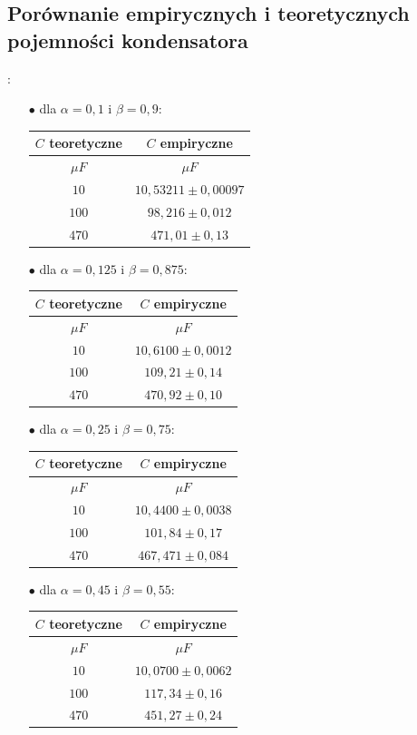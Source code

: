 \documentclass[12pt]{mwart}
\begin{document}
	\subsection{Porównanie empirycznych i teoretycznych pojemności kondensatora}:
	\begin{itemize}
		\item[$\bullet$] dla $\alpha=0,1$ i $\beta=0,9$:
		\begin{table}[h]
			\centering
			\begin{tabular}{c|c}
				\hline
				$C$ teoretyczne & $C$ empiryczne \\ \hline
				$\mu F$ & $\mu F$ \\ \hline
				$10$ & $10,53211\pm0,00097$  \\ \hline
				$100$ & $98,216\pm0,012$  \\ \hline
				$470$ & $471,01\pm0,13$  \\ \hline
			\end{tabular}
		\end{table}
		\item[$\bullet$] dla $\alpha=0,125$ i $\beta=0,875$:
		\begin{table}[h]
			\centering
			\begin{tabular}{c|c}
				\hline
				$C$ teoretyczne & $C$ empiryczne \\ \hline
				$\mu F$ & $\mu F$ \\ \hline
				$10$ & $10,6100\pm0,0012$  \\ \hline
				$100$ & $109,21\pm0,14$  \\ \hline
				$470$ & $470,92\pm0,10$  \\ \hline
			\end{tabular}
		\end{table}
		\item[$\bullet$] dla $\alpha=0,25$ i $\beta=0,75$:
		\begin{table}[H]
			\centering
			\begin{tabular}{c|c}
				\hline
				$C$ teoretyczne & $C$ empiryczne \\ \hline
				$\mu F$ & $\mu F$ \\ \hline
				$10$ & $10,4400\pm0,0038$  \\ \hline
				$100$ & $101,84\pm0,17$  \\ \hline
				$470$ & $467,471\pm0,084$  \\ \hline
			\end{tabular}
		\end{table}
		\item[$\bullet$] dla $\alpha=0,45$ i $\beta=0,55$:
		\begin{table}[h]
			\centering
			\begin{tabular}{c|c}
				\hline
				$C$ teoretyczne & $C$ empiryczne \\ \hline
				$\mu F$ & $\mu F$ \\ \hline
				$10$ & $10,0700\pm0,0062$  \\ \hline
				$100$ & $117,34\pm0,16$  \\ \hline
				$470$ & $451,27\pm0,24$  \\ \hline
			\end{tabular}
		\end{table}
	\end{itemize}
\end{document}

